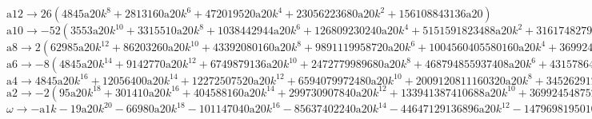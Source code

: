 \documentclass[12pt,a4paper,draft]{article}
\begin{document}
$\text{a12}\to 26 \left(4845 \text{a20} k^8+2813160 \text{a20} k^6+472019520 \text{a20} k^4+23056223680 \text{a20} k^2+156108843136 \text{a20}\right)$\\
$\text{a10}\to -52 \left(3553 \text{a20} k^{10}+3315510 \text{a20} k^8+1038442944 \text{a20} k^6+126809230240 \text{a20} k^4+5151591823488 \text{a20} k^2+31617482799360 \text{a20}\right)$\\
$\text{a8}\to 2 \left(62985 \text{a20} k^{12}+86203260 \text{a20} k^{10}+43392080160 \text{a20} k^8+9891119958720 \text{a20} k^6+1004560405580160 \text{a20} k^4+36992454875251200 \text{a20} k^2+221137393247019008 \text{a20}\right)$\\
$\text{a6}\to -8 \left(4845 \text{a20} k^{14}+9142770 \text{a20} k^{12}+6749879136 \text{a20} k^{10}+2472779989680 \text{a20} k^8+468794855937408 \text{a20} k^6+43157864021126400 \text{a20} k^4+1547961752729133056 \text{a20} k^2+9725860232374353920 \text{a20}\right)$\\
$\text{a4}\to 4845 \text{a20} k^{16}+12056400 \text{a20} k^{14}+12272507520 \text{a20} k^{12}+6594079972480 \text{a20} k^{10}+2009120811160320 \text{a20} k^8+345262912169011200 \text{a20} k^6+30959235054582661120 \text{a20} k^4+1167103227884922470400 \text{a20} k^2+8542922993365665447936 \text{a20}$\\
$\text{a2}\to -2 \left(95 \text{a20} k^{18}+301410 \text{a20} k^{16}+404588160 \text{a20} k^{14}+299730907840 \text{a20} k^{12}+133941387410688 \text{a20} k^{10}+36992454875251200 \text{a20} k^8+6191847010916532224 \text{a20} k^6+583551613942461235200 \text{a20} k^4+25628768980096996343808 \text{a20} k^2+263539423074198749184000 \text{a20}\right)$\\
$\omega \to -\text{a1} k-19 \text{a20} k^{20}-66980 \text{a20} k^{18}-101147040 \text{a20} k^{16}-85637402240 \text{a20} k^{14}-44647129136896 \text{a20} k^{12}-14796981950100480 \text{a20} k^{10}-3095923505458266112 \text{a20} k^8-389034409294974156800 \text{a20} k^6-25628768980096996343808 \text{a20} k^4-527078846148397498368000 \text{a20} k^2+13835476912905325117440000 \text{a20}$\\
\end{document}
